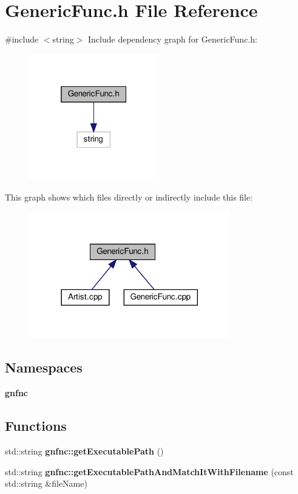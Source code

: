 \section{Generic\+Func.\+h File Reference}
\label{_generic_func_8h}
{\ttfamily \#include $<$string$>$}\newline
Include dependency graph for Generic\+Func.\+h\+:\nopagebreak
\begin{figure}[H]
\begin{center}
\leavevmode
\includegraphics[width=160pt]{_generic_func_8h__incl}
\end{center}
\end{figure}
This graph shows which files directly or indirectly include this file\+:\nopagebreak
\begin{figure}[H]
\begin{center}
\leavevmode
\includegraphics[width=248pt]{_generic_func_8h__dep__incl}
\end{center}
\end{figure}
\subsection*{Namespaces}
\begin{DoxyCompactItemize}
\item 
 \textbf{ gnfnc}
\end{DoxyCompactItemize}
\subsection*{Functions}
\begin{DoxyCompactItemize}
\item 
std\+::string \textbf{ gnfnc\+::get\+Executable\+Path} ()
\item 
std\+::string \textbf{ gnfnc\+::get\+Executable\+Path\+And\+Match\+It\+With\+Filename} (const std\+::string \&file\+Name)
\end{DoxyCompactItemize}
